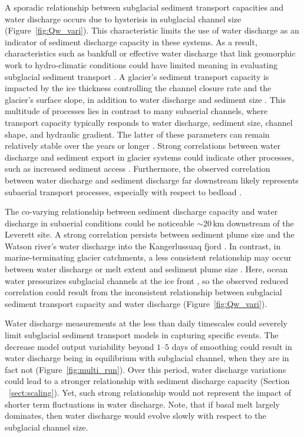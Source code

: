 \documentclass[esurf, manuscript]{copernicus}
\begin{document}
A sporadic relationship between subglacial sediment transport capacities and water discharge occurs due to hysterisis in subglacial channel size (Figure~\ref{fig:Qw_vari}).
This characteristic limits the use of water discharge as an indicator of sediment discharge capacity in these systems.
As a result, characteristics such as bankfull or effective water discharge that link geomorphic work to hydro-climatic conditions could have limited meaning in evaluating subglacial sediment transport \citep{wolman1960,lenzi2006}.
A glacier's sediment transport capacity is impacted by the ice thickness controlling the channel closure rate and the glacier's surface slope, in addition to water discharge and sediment size \citep[Figure~\ref{fig:multi_run}, Section~\ref{sect:sub_mode}; ][]{rothlisberger1972,gimbert2016,stevens2022,walder1994}.
This multitude of processes lies in contrast to many subaerial channels, where transport capacity typically responds to water discharge, sediment size, channel shape,  and hydraulic gradient.
The latter of these parameters can remain relatively stable over the years or longer \citep[Section~\ref{sect:fluv}; e.g.][]{tucker1997}.
Strong correlations between water discharge and sediment export in glacier systems could indicate  other processes, such as increased sediment access \citep{zhang2022}.
Furthermore, the observed correlation between water discharge and sediment discharge far downstream likely represents subaerial transport processes, especially with respect to bedload \citep{mancini2023}.

The co-varying relationship between sediment discharge capacity and water discharge in subaerial conditions could be noticeable $\sim20$\,\unit{km} downstream of the Leverett site.
A strong correlation persists between sediment plume size and the Watson river's water discharge into the Kangerlussuaq fjord \citep{chu2009,mcgrath2010}.
In contrast, in marine-terminating glacier catchments, a less consistent relationship may occur between water discharge or melt extent and sediment plume size \citep{chu2012,tedstone2012}.
Here, ocean water pressurizes subglacial channels at the ice front \citep[e.g.][]{how2017}, so the observed reduced correlation could result from the inconsistent relationship between subglacial sediment transport capacity and water discharge (Figure~\ref{fig:Qw_vari}).

Water discharge measurements at the less than daily timescales could severely limit subglacial sediment transport models in capturing specific events.
The decrease model output variability beyond $1$--$5$ days of smoothing could result in water discharge being in equilibrium with subglacial channel, when they are in fact not (Figure~\ref{fig:multi_run}).
Over this period, water discharge variations could lead to a stronger relationship with sediment discharge capacity (Section ~\ref{sect:scaling}).
Yet, such strong relationship would not represent the impact of shorter term fluctuations in water discharge.
Note, that if basal melt largely dominates, then water discharge would evolve slowly with respect to the subglacial channel size.
\end{document}
